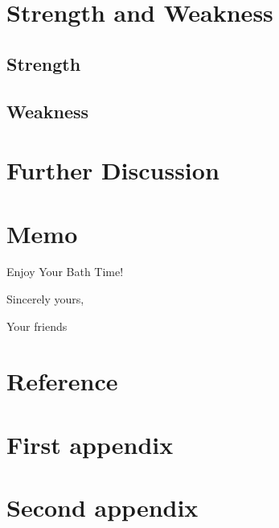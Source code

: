 \documentclass{mcmthesis}
\begin{document}
\section{Strength and Weakness}
\subsection{Strength}
\subsection{Weakness}

\section{Further Discussion}



\newpage
\section*{Memo} %

\begin{letter}{Enjoy Your Bath Time!}


\vspace{\parskip}

Sincerely yours,

Your friends

\end{letter}










\newpage
\section*{Reference} %
\printbibliography




\begin{appendices}
\section{First appendix}
\section{Second appendix}
\end{appendices}
\end{document}
